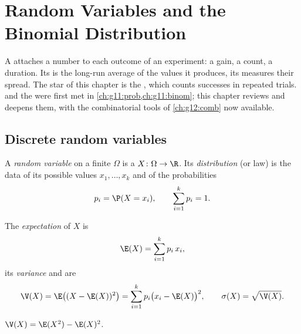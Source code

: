 \chapter{Random Variables and the Binomial Distribution}\label{ch:g12:randvar}

A  attaches a number to each outcome of an experiment: a
gain, a count, a duration. Its  is the long-run average of the
values it produces, its  measures their spread. The star of this
chapter is the , which counts successes in repeated
 trials.  and the  were
first met in \cref{ch:g11:prob,ch:g11:binom}; this chapter reviews and
deepens them, with the combinatorial tools of \cref{ch:g12:comb} now
available.

\section{Discrete random variables}

\begin{definition}\label{def:g12:randvar:rv}
A \emph{random variable} on a finite 
$\Omega$ is a  $X \colon \Omega \to \R$. Its
\emph{distribution} (or law) is the data of its possible
values $x_1, \dots, x_k$ and of the probabilities
\[
p_i = \P(X = x_i), \qquad \sum_{i=1}^{k} p_i = 1 .
\]
\end{definition}

\begin{definition}\label{def:g12:randvar:exp}
The \emph{expectation} of $X$ is
\[
\E(X) = \sum_{i=1}^{k} p_i\, x_i ,
\]
its \emph{variance} and \emph{} are
\[
\V(X) = \E\bigl((X - \E(X))^2\bigr) = \sum_{i=1}^k p_i\bigl(x_i - \E(X)\bigr)^2,
\qquad
\sigma(X) = \sqrt{\V(X)} .
\]
\end{definition}

\begin{proposition}\label{prop:g12:randvar:konig}
$\V(X) = \E(X^2) - \E(X)^2$.
\end{proposition}

